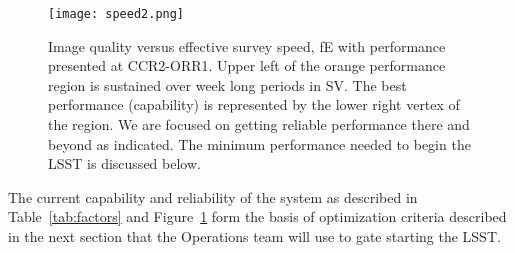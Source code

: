 \begin{figure}[t]
  \centering
\texttt{[image: speed2.png]}
\caption{Image quality versus effective survey speed, fE with performance presented at CCR2-ORR1. Upper left of the orange performance region is sustained over week long periods in SV. The best performance (capability) is represented by the lower right vertex of the region. We are focused on getting reliable performance there and beyond as indicated. The minimum performance needed to begin the LSST is discussed below.}
\label{speed2}
\end{figure}

The current capability and reliability of the system as described in Table~\ref{tab:factors} and Figure~\ref{speed2} form the basis of optimization criteria described in the next section that the Operations team will use to gate starting the LSST. 

\newpage


